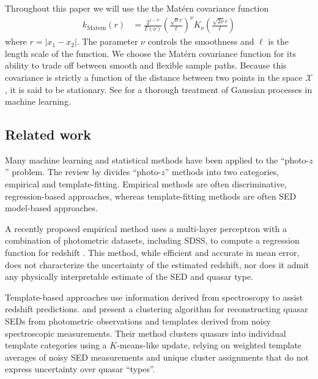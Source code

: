 \documentclass{article}
\newcommand{\mcX}{\mathcal{X}}
\begin{document}
Throughout this paper we will use the the Mat\'{e}rn \cite{Matern1986spatial} covariance function
\begin{align}
  k_{\text{Matern}}(r)
    &= \frac{2^{1-\nu}}{\Gamma(\nu)} 
       \left( \frac{\sqrt{\nu} r}{\ell} \right) ^\nu
       K_\nu\left( \frac{\sqrt{2\nu} r}{\ell}\right)
\end{align}
where ${r = |x_1 - x_2|}$.  The parameter $\nu$ controls the smoothness and $\ell$ is the length scale of the function.  
We choose the Mat\'{e}rn covariance function for its ability to trade off between smooth and flexible sample paths.  
Because this covariance is strictly a function of the distance between two points in the space $\mcX$, it is said to be stationary. 
See \citet{rasmussen2006gaussian} for a thorough treatment of Gaussian processes in machine learning. 

\subsection{Related work}
Many machine learning and statistical methods have been applied to the ``photo-$z$'' problem. The review by \citet{walcher2011fitting} divides ``photo-$z$'' methods into two categories, empirical and template-fitting.  Empirical methods are often discriminative, regression-based approaches, whereas template-fitting methods are often SED model-based approaches.  

A recently proposed empirical method uses a multi-layer perceptron with a combination of photometric datasets, including SDSS, 
to compute a regression function for redshift \cite{brescia2013photometric}. 
This method, while efficient and accurate in mean error, does not characterize the uncertainty of the estimated redshift, nor does it admit any physically interpretable estimate of the SED and quasar type.  

Template-based approaches use information derived from spectroscopy to assist redshift predictions.  
\citet{budavari2001photometric} and \citet{richards2001photometric} present a clustering algorithm for reconstructing quasar SEDs from photometric observations and templates derived from noisy spectroscopic measurements.  
Their method clusters quasars into individual template categories using a $K$-means-like update, relying on weighted template averages of noisy SED measurements and unique cluster assignments that do not express uncertainty over quasar ``types''. 
\end{document}
